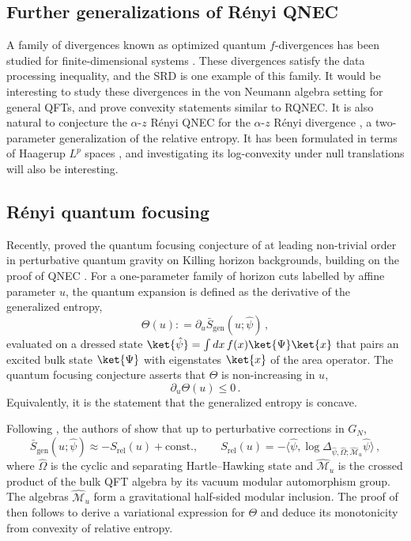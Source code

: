 \documentclass[11pt,a4paper]{article}
\theoremstyle{plain}
\numberwithin{theorem}{section}
\theoremstyle{definition}
\newcommand{\del}{\partial}
\newcommand{\wh}[1]{\widehat{#1}}
\newcommand{\?}{\overset{?}{=}}
\newcommand{\defeq}{\mathrel{\mathop:}=}
\renewcommand{\a}{\alpha}	%
\newcommand{\D}{\Delta}
\newcommand{\W}{\Omega}
\newcommand{\cM}{\mathcal{M}}
\newcommand{\az}{$\a$-$z$}
\newcommand{\barSgen}{\bar{S}_{\text{gen}}}
\begin{document}
\subsection*{Further generalizations of R\'enyi QNEC}
A family of divergences known as optimized quantum $f$-divergences has been studied for finite-dimensional systems \cite{Wilde:2017okz}. These divergences satisfy the data processing inequality, and the SRD is one example of this family. It would be interesting to study these divergences in the von Neumann algebra setting for general QFTs, and prove convexity statements similar to RQNEC. 
It is also natural to conjecture the {\az} R\'enyi QNEC for the {\az} R\'enyi divergence \cite{Audenaert:2015npv}, a two-parameter generalization of the relative entropy. It has been formulated in terms of Haagerup $L^p$ spaces \cite{Kato:2023aro,Kato:2023hlj,Hiai:2024qve}, and investigating its log-convexity under null translations will also be interesting.


\subsection*{R\'enyi quantum focusing}

Recently, \cite{Chandrasekaran:2026pnc} proved the quantum focusing conjecture of \cite{Bousso:2015mna} at leading non-trivial order in perturbative quantum gravity on Killing horizon backgrounds, building on the proof of QNEC \cite{Ceyhan:2018zfg}. For a one-parameter family of horizon cuts labelled by affine parameter $u$, the quantum expansion is defined as the derivative of the generalized entropy,
\begin{equation}
    \Theta(u) \defeq \del_u\barSgen(u;\hat\psi)\,,
\end{equation} 
evaluated on a dressed state $\ket{\hat\psi}=\int dx\,f(x)\ket{\Psi}\ket{x}$ that pairs an excited bulk state $\ket{\Psi}$ with eigenstates $\ket{x}$ of the area operator. The quantum focusing conjecture asserts that $\Theta$ is non-increasing in $u$, 
\begin{equation}        \label{eq:expansion-monotonicity}
    \del_u \Theta(u)\leq 0\,.
\end{equation}
Equivalently, it is the statement that the generalized entropy is concave.

Following \cite{Chandrasekaran:2022eqq}, the authors of \cite{Chandrasekaran:2026pnc} show that up to perturbative corrections in $G_N$,
\begin{equation}\label{eq:rel-ent-gravitational}
    \barSgen(u;\hat\psi) \approx -S_{\text{rel}}(u) + \text{const.}, \qquad S_{\text{rel}}(u) = -\langle\hat\psi,\log\D_{\hat\psi,\hat\W;\wh{\cM}_u}\hat\psi\rangle\,,
\end{equation}
where $\hat\W$ is the cyclic and separating Hartle--Hawking state and $\widehat{\cM}_u$ is the crossed product of the bulk QFT algebra by its vacuum modular automorphism group. The algebras $\wh{\cM}_u$ form a gravitational half-sided modular inclusion. The proof of \cite{Chandrasekaran:2026pnc} then follows \cite{Ceyhan:2018zfg} to derive a variational expression for $\Theta$ and deduce its monotonicity from convexity of relative entropy.
\end{document}
